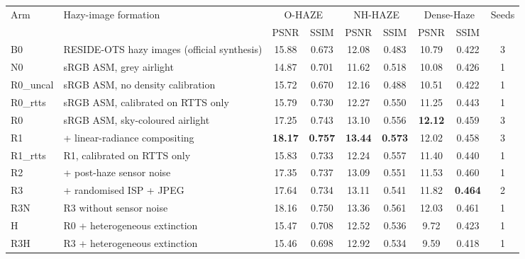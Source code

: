 \begin{tabular}{llccccccc}
\toprule
Arm & Hazy-image formation & \multicolumn{2}{c}{O-HAZE} & \multicolumn{2}{c}{NH-HAZE} & \multicolumn{2}{c}{Dense-Haze} & Seeds \\
\cmidrule(lr){3-4}\cmidrule(lr){5-6}\cmidrule(lr){7-8}
 & & PSNR & SSIM & PSNR & SSIM & PSNR & SSIM & \\
\midrule
B0 & RESIDE-OTS hazy images (official synthesis) & 15.88 & 0.673 & 12.08 & 0.483 & 10.79 & 0.422 & 3 \\
N0 & sRGB ASM, grey airlight & 14.87 & 0.701 & 11.62 & 0.518 & 10.08 & 0.426 & 1 \\
R0\_uncal & sRGB ASM, no density calibration & 15.72 & 0.670 & 12.16 & 0.488 & 10.51 & 0.422 & 1 \\
R0\_rtts & sRGB ASM, calibrated on RTTS only & 15.79 & 0.730 & 12.27 & 0.550 & 11.25 & 0.443 & 1 \\
R0 & sRGB ASM, sky-coloured airlight & 17.25 & 0.743 & 13.10 & 0.556 & \textbf{12.12} & 0.459 & 3 \\
R1 & + linear-radiance compositing & \textbf{18.17} & \textbf{0.757} & \textbf{13.44} & \textbf{0.573} & 12.02 & 0.458 & 3 \\
R1\_rtts & R1, calibrated on RTTS only & 15.83 & 0.733 & 12.24 & 0.557 & 11.40 & 0.440 & 1 \\
R2 & + post-haze sensor noise & 17.35 & 0.737 & 13.09 & 0.551 & 11.53 & 0.460 & 1 \\
R3 & + randomised ISP + JPEG & 17.64 & 0.734 & 13.11 & 0.541 & 11.82 & \textbf{0.464} & 2 \\
R3N & R3 without sensor noise & 18.16 & 0.750 & 13.36 & 0.561 & 12.03 & 0.461 & 1 \\
H & R0 + heterogeneous extinction & 15.47 & 0.708 & 12.52 & 0.536 & 9.72 & 0.423 & 1 \\
R3H & R3 + heterogeneous extinction & 15.46 & 0.698 & 12.92 & 0.534 & 9.59 & 0.418 & 1 \\
\bottomrule
\end{tabular}